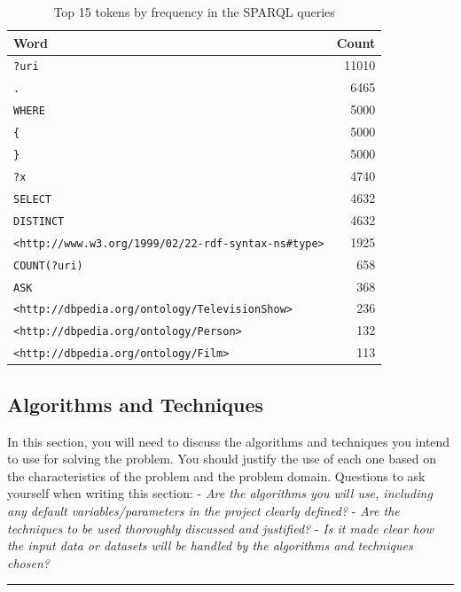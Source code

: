 \documentclass[12pt]{article}
\begin{document}
\begin{table}
  \centering
  \begin{tabular}{ l | r }
    \textbf{Word} & \textbf{Count} \\
    \hline
    \texttt{?uri} & 11010 \\
    \texttt{.} & 6465 \\
    \texttt{WHERE} & 5000 \\
    \texttt{\{} & 5000 \\
    \texttt{\}} & 5000 \\
    \texttt{?x} & 4740 \\
    \texttt{SELECT} & 4632 \\
    \texttt{DISTINCT} & 4632 \\
    \texttt{<http://www.w3.org/1999/02/22-rdf-syntax-ns\#type>} & 1925 \\
    \texttt{COUNT(?uri)} & 658 \\
    \texttt{ASK} & 368 \\
    \texttt{<http://dbpedia.org/ontology/TelevisionShow>} & 236 \\
    \texttt{<http://dbpedia.org/ontology/Person>} & 132 \\
    \texttt{<http://dbpedia.org/ontology/Film>} & 113
  \end{tabular}
  \caption{Top 15 tokens by frequency in the SPARQL queries}
  \label{tbl:sparql_token_freq}
\end{table}

\subsection{Algorithms and Techniques}\label{algorithms-and-techniques}

In this section, you will need to discuss the algorithms and techniques
you intend to use for solving the problem. You should justify the use of
each one based on the characteristics of the problem and the problem
domain. Questions to ask yourself when writing this section: - \emph{Are
the algorithms you will use, including any default variables/parameters
in the project clearly defined?} - \emph{Are the techniques to be used
thoroughly discussed and justified?} - \emph{Is it made clear how the
input data or datasets will be handled by the algorithms and techniques
chosen?}

\begin{center}\rule{0.5\linewidth}{\linethickness}\end{center}
\end{document}
